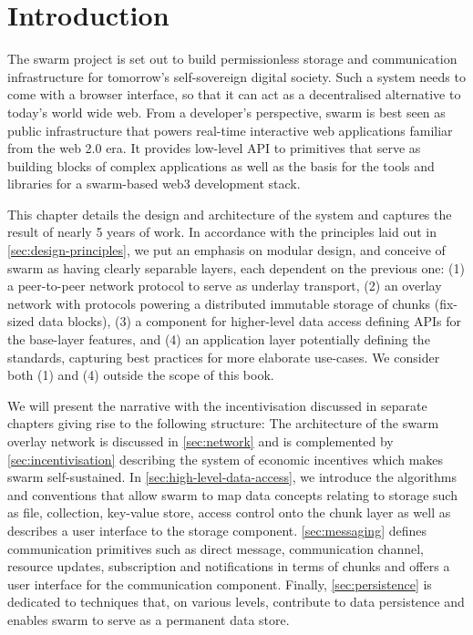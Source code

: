 \chapter{Introduction}

The swarm project is set out to build permissionless storage and communication infrastructure for tomorrow's self-sovereign digital society. Such a system needs to come with a browser interface, so that it can act as a decentralised alternative to today's world wide web. From a developer's perspective, swarm is best seen as public infrastructure that powers real-time interactive web applications familiar from the web 2.0 era. It provides low-level API to primitives that serve as building blocks of complex applications as well as the basis for the tools and libraries for a swarm-based web3 development stack.

This chapter details the design and architecture of the system and captures the result of nearly 5 years of work. In accordance with the principles laid out in \ref{sec:design-principles}, we put an emphasis on modular design, and conceive of swarm as having clearly separable layers, each dependent on the previous one: (1) a peer-to-peer network protocol to serve as underlay transport, (2) an overlay network with protocols powering a distributed immutable storage of chunks (fix-sized data blocks),  (3) a component for higher-level data access defining APIs for the base-layer features, and (4) an application layer potentially defining the standards, capturing best practices for more elaborate use-cases. We consider both (1) and (4) outside the scope of this book.

We will present the narrative with the incentivisation discussed in separate chapters giving rise to the following structure:
The architecture of the swarm overlay network is discussed in \ref{sec:network} and is complemented by \ref{sec:incentivisation} describing the system of economic incentives which makes swarm self-sustained. In \ref{sec:high-level-data-access}, we introduce the algorithms and conventions that allow swarm to map data concepts relating to storage such as file, collection, key-value store, access control onto the chunk layer as well as describes a user interface to the storage component. \ref{sec:messaging} defines communication primitives such as direct message, communication channel, resource updates, subscription and notifications in terms of chunks and offers a user interface for the communication component. Finally,  \ref{sec:persistence} is dedicated to techniques that, on various levels, contribute to data persistence and enables swarm to serve as a permanent data store. 

